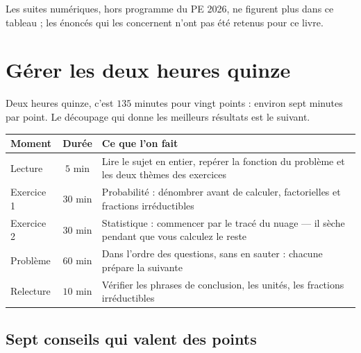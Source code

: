 \noindent Les suites numériques, hors programme du PE 2026, ne figurent plus
dans ce tableau ; les énoncés qui les concernent n'ont pas été retenus pour
ce livre.

\section{Gérer les deux heures quinze}

Deux heures quinze, c'est $135$ minutes pour vingt points : environ sept
minutes par point. Le découpage qui donne les meilleurs résultats est le
suivant.

\begin{center}
\renewcommand{\arraystretch}{1.4}
\begin{tabular}{|L{3.2cm}|c|L{6.4cm}|}
\hline
\textbf{Moment} & \textbf{Durée} & \textbf{Ce que l'on fait}\\
\hline
Lecture & $5$ min & Lire le sujet en entier, repérer la fonction du
problème et les deux thèmes des exercices\\
Exercice 1 & $30$ min & Probabilité : dénombrer avant de calculer,
factorielles et fractions irréductibles\\
Exercice 2 & $30$ min & Statistique : commencer par le tracé du nuage — il
sèche pendant que vous calculez le reste\\
Problème & $60$ min & Dans l'ordre des questions, sans en sauter : chacune
prépare la suivante\\
Relecture & $10$ min & Vérifier les phrases de conclusion, les unités, les
fractions irréductibles\\
\hline
\end{tabular}
\end{center}

\subsection*{Sept conseils qui valent des points}

